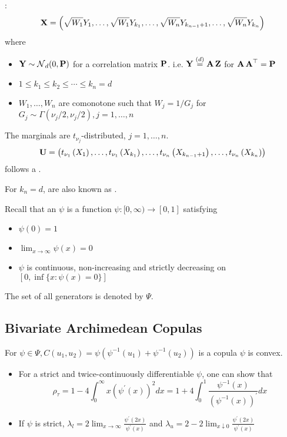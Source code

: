 : $$
\operatorname{\boldsymbol{\mathbf{X}}}=\left(\sqrt{W_{1}} Y_{1}, \ldots, \sqrt{W_{1}} Y_{k_{1}}, \ldots, \sqrt{W_{n}} Y_{k_{n-1}+1}, \ldots, \sqrt{W_{n}} Y_{k_{n}}\right)
$$
where 
\begin{itemize}[leftmargin=*]
    \item $\operatorname{\boldsymbol{\mathbf{Y}}} \sim \operatorname{\mathcal{N}}_{d}(0, \boldsymbol{\mathbf{P}})$ for a correlation matrix $\boldsymbol{\mathbf{P}}$. i.e. $\operatorname{\boldsymbol{\mathbf{Y}}} \stackrel{(d)}{=} \operatorname{\boldsymbol{\mathbf{A}}} \operatorname{\boldsymbol{\mathbf{Z}}}$ for $\operatorname{\boldsymbol{\mathbf{A}}} \operatorname{\boldsymbol{\mathbf{A}}}^{\operatorname{\top}}=\boldsymbol{\mathbf{P}}$
    \item $1 \leq k_{1} \leq k_{2} \leq \cdots \leq k_{n}=d$
    \item $W_{1}, \ldots, W_{n}$ are comonotone such that $W_{j}=1 / G_{j}$ for $G_{j} \sim \Gamma\left(\nu_{j} / 2, \nu_{j} / 2\right), j=1, \ldots, n$
\end{itemize}

The marginals are $t_{\nu_{j}}$-distributed, $j=1, \ldots, n$.
$$
\operatorname{\boldsymbol{\mathbf{U}}}=\left(t_{\nu_{1}}\left(X_{1}\right), \ldots, t_{\nu_{1}}\left(X_{k_{1}}\right), \ldots, t_{\nu_{n}}\left(X_{k_{n-1}+1}\right), \ldots, t_{\nu_{n}}\left(X_{k_{n}}\right)\right)
$$
follows a .

For $k_{n}=d$,  are also known as .









Recall that an  $\psi$ is a function $\psi:[0, \infty) \rightarrow[0,1]$ satisfying
\begin{itemize}[leftmargin=*]
    \item $\psi(0)=1$
    \item $\lim _{x \rightarrow \infty} \psi(x)=0$
    \item $\psi$ is continuous, non-increasing and strictly decreasing on $[0, \inf \{x: \psi(x)=0\}]$
\end{itemize}
The set of all generators is denoted by $\Psi$.


\subsection*{Bivariate Archimedean Copulas}
For $\psi \in \Psi, C\left(u_{1}, u_{2}\right)=\psi\left(\psi^{-1}\left(u_{1}\right)+\psi^{-1}\left(u_{2}\right)\right)$ is a copula  $\psi$ is convex.

\begin{itemize}[leftmargin=*]
    \item For a strict and twice-continuously differentiable $\psi$, one can show that
$$
\rho_{\tau}=1-4 \int_{0}^{\infty} x\left(\psi^{\prime}(x)\right)^{2} d x=1+4 \int_{0}^{1} \frac{\psi^{-1}(x)}{\left(\psi^{-1}(x)\right)^{\prime}} d x
$$
    \item If $\psi$ is strict, $\lambda_{l}=2 \lim _{x \rightarrow \infty} \frac{\psi^{\prime}(2 x)}{\psi^{\prime}(x)}$ and $\lambda_{u}=2-2 \lim _{x \downarrow 0} \frac{\psi^{\prime}(2 x)}{\psi^{\prime}(x)}$
\end{itemize}






